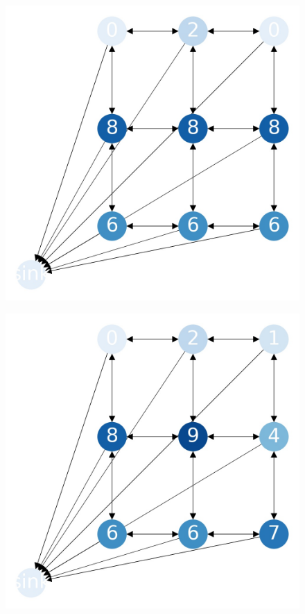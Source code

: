 \documentclass{beamer}
\begin{document}
    \begin{frame}
      \begin{figure}[h!]
        \centering
          \includegraphics[scale=0.25]{sandpile_-6}
      \end{figure}
    \end{frame}
    

    \begin{frame}
      \begin{figure}[h!]
        \centering
          \includegraphics[scale=0.25]{sandpile_-7}
      \end{figure}
    \end{frame}
    
\end{document}
